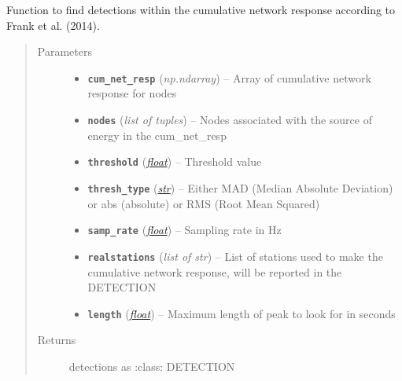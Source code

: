 \documentclass[a4paper,10pt,english]{sphinxmanual}
\begin{document}
\begin{fulllineitems}
\label{core:bright_lights._find_detections}
Function to find detections within the cumulative network response according
to Frank et al. (2014).
\begin{quote}\begin{description}
\item[{Parameters}] \leavevmode\begin{itemize}
\item {} 
\textbf{\texttt{cum\_net\_resp}} (\emph{np.ndarray}) -- Array of cumulative network response for nodes

\item {} 
\textbf{\texttt{nodes}} (\emph{list of tuples}) -- Nodes associated with the source of energy in the cum\_net\_resp

\item {} 
\textbf{\texttt{threshold}} (\href{https://docs.python.org/library/functions.html\#float}{\emph{float}}) -- Threshold value

\item {} 
\textbf{\texttt{thresh\_type}} (\href{https://docs.python.org/library/functions.html\#str}{\emph{str}}) -- Either MAD (Median Absolute Deviation) or abs (absolute)    or RMS (Root Mean Squared)

\item {} 
\textbf{\texttt{samp\_rate}} (\href{https://docs.python.org/library/functions.html\#float}{\emph{float}}) -- Sampling rate in Hz

\item {} 
\textbf{\texttt{realstations}} (\emph{list of str}) -- List of stations used to make the cumulative network    response, will be reported in the DETECTION

\item {} 
\textbf{\texttt{length}} (\href{https://docs.python.org/library/functions.html\#float}{\emph{float}}) -- Maximum length of peak to look for in seconds

\end{itemize}

\item[{Returns}] \leavevmode
detections as :class: DETECTION

\end{description}\end{quote}

\end{fulllineitems}
\end{document}
